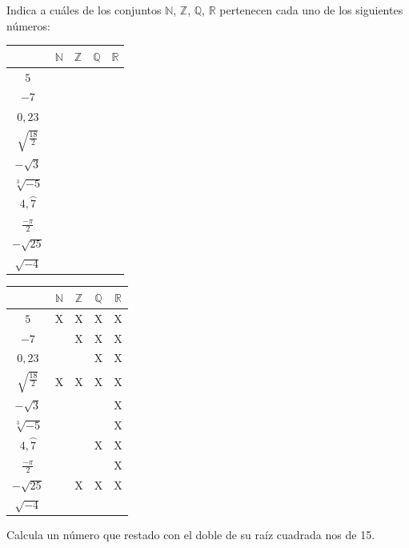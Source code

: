 \documentclass[addpoints,spanish, 12pt,a4paper]{exam}
\begin{document}
\begin{questions}

\question[2] Indica a cuáles de los conjuntos
$\mathbb{N}$, $\mathbb{Z}$, $\mathbb{Q}$, $\mathbb{R}$ pertenecen cada uno de los siguientes números:
\begin{center}
\begin{tabular}{|c |c |c |c |c|}\hline
&$\mathbb{N}$& $\mathbb{Z}$& $\mathbb{Q}$&$\mathbb{R}$\\ 
\hline
$5$&&&&\\
\hline
$-7$&&&&\\
\hline
$0,23$&&&&\\
\hline
$\sqrt{\frac{18}{2}}$&&&&\\
\hline
$-\sqrt{3}$&&&&\\
\hline
$\sqrt[3]{-5}$&&&&\\
\hline
$4,\wideparen{7}$&&&&\\
\hline
$\frac{-\pi}{2}$&&&&\\
\hline
$-\sqrt{25}$&&&&\\
\hline
$\sqrt{-4}$&&&&\\
\hline
\end{tabular}

\end{center}

\begin{solution}
\begin{tabular}{|c |c |c |c |c|}\hline
&$\mathbb{N}$& $\mathbb{Z}$& $\mathbb{Q}$&$\mathbb{R}$\\ 
\hline
$5$&X&X&X&X\\
\hline
$-7$&&X&X&X\\
\hline
$0,23$&&&X&X\\
\hline
$\sqrt{\frac{18}{2}}$&X&X&X&X\\
\hline
$-\sqrt{3}$&&&&X\\
\hline
$\sqrt[3]{-5}$&&&&X\\
\hline
$4,\wideparen{7}$&&&X&X\\
\hline
$\frac{-\pi}{2}$&&&&X\\
\hline
$-\sqrt{25}$&&X&X&X\\
\hline
$\sqrt{-4}$&&&&\\
\hline
\end{tabular}
\end{solution}

\addpoints



\question[2] Calcula un número que restado con el doble de su raíz cuadrada nos de 15.
\addpoints %



\end{questions}
\end{document}
